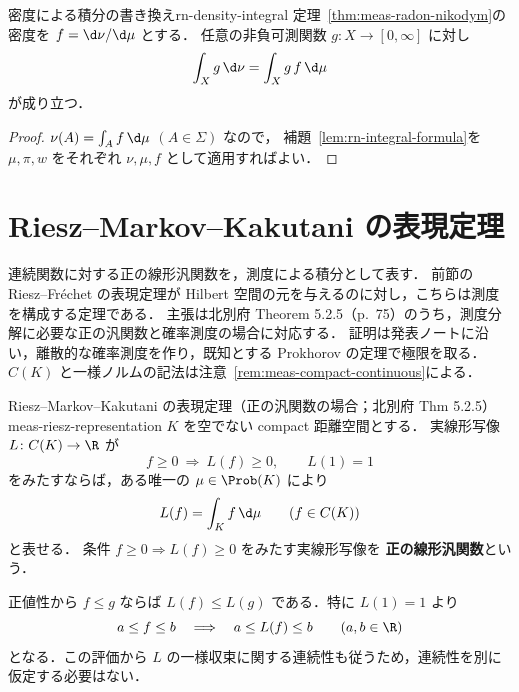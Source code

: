 \begin{corollary}{密度による積分の書き換え}{rn-density-integral}
  定理~\ref{thm:meas-radon-nikodym}の密度を $f=\d\nu/\d\mu$ とする．
  任意の非負可測関数 $g\colon X\to[0,\infty]$ に対し
  \[
    \int_X g\,\d\nu=\int_X g\,f\,\d\mu
  \]
  が成り立つ．
\end{corollary}

\begin{proof}
  $\nu(A)=\int_Af\,\d\mu$ $(A\in\Sigma)$ なので，
  補題~\ref{lem:rn-integral-formula}を $\mu,\pi,w$ をそれぞれ $\nu,\mu,f$ として適用すればよい．
\end{proof}

\section{Riesz--Markov--Kakutani の表現定理}
\label{sec:dis-riesz-representation}

連続関数に対する正の線形汎関数を，測度による積分として表す．
前節の Riesz--Fréchet の表現定理が Hilbert 空間の元を与えるのに対し，こちらは測度を構成する定理である．
主張は北別府 Theorem 5.2.5（p.~75）のうち，測度分解に必要な正の汎関数と確率測度の場合に対応する．
証明は発表ノートに沿い，離散的な確率測度を作り，既知とする Prokhorov の定理で極限を取る．
$C(K)$ と一様ノルムの記法は注意~\ref{rem:meas-compact-continuous}による．

\begin{theorem}{Riesz--Markov--Kakutani の表現定理（正の汎関数の場合；北別府 Thm 5.2.5）}{meas-riesz-representation}
  $K$ を空でない compact 距離空間とする．
  実線形写像 $L\colon C(K)\to\R$ が
  \[
    f\geq0\ \Longrightarrow\ L(f)\geq0,\qquad L(1)=1
  \]
  をみたすならば，ある唯一の $\mu\in\Prob(K)$ により
  \[
    L(f)=\int_Kf\,\d\mu\qquad(f\in C(K))
  \]
  と表せる．
  条件 $f\geq0\Rightarrow L(f)\geq0$ をみたす実線形写像を
  \textbf{正の線形汎関数}という．
\end{theorem}

正値性から $f\leq g$ ならば $L(f)\leq L(g)$ である．特に $L(1)=1$ より
\[
  a\leq f\leq b\quad\Longrightarrow\quad a\leq L(f)\leq b
  \qquad(a,b\in\R)
\]
となる．この評価から $L$ の一様収束に関する連続性も従うため，連続性を別に仮定する必要はない．

